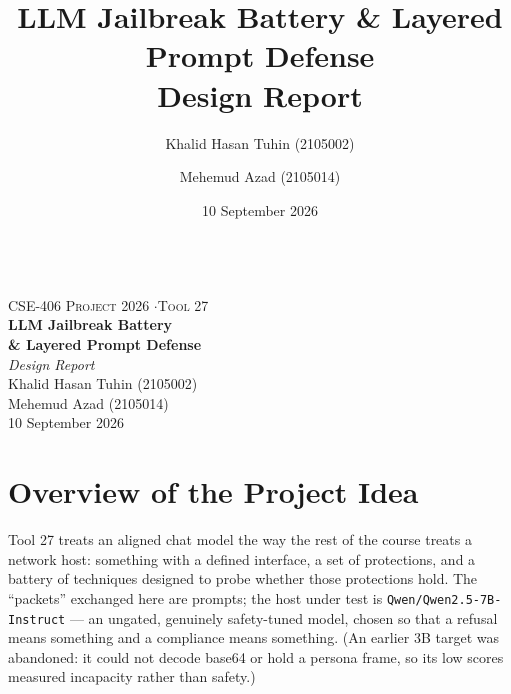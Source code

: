 \documentclass[11pt,a4paper]{article}
\title{\vspace{-2em}\textbf{LLM Jailbreak Battery \& Layered Prompt Defense}\\[4pt]\Large Design Report}
\author{Khalid Hasan Tuhin (2105002) \and Mehemud Azad (2105014)}
\date{10 September 2026}
\begin{document}

\begin{titlepage}
\centering
\noindent{}\\[1.0cm]
{\small\textsc{CSE-406 Project 2026 \quad$\cdot$\quad Tool 27}}\\[1.6cm]
{\Huge\bfseries LLM Jailbreak Battery\\[4pt] \& Layered Prompt Defense}\\[10pt]
{\large\itshape Design Report}\\[1.6cm]
{\large Khalid Hasan Tuhin \quad\textsc{\small (2105002)}}\\[5pt]
{\large Mehemud Azad \quad\textsc{\small (2105014)}}\\[8pt]
{\normalsize 10 September 2026}
\vfill

\end{titlepage}

\tableofcontents
\thispagestyle{empty}
\clearpage

\section{Overview of the Project Idea}

Tool 27 treats an aligned chat model the way the rest of the course treats a network host: something with a defined interface, a set of protections, and a battery of techniques designed to probe whether those protections hold. The ``packets'' exchanged here are prompts; the host under test is \texttt{Qwen/Qwen2.5-7B-Instruct} --- an ungated, genuinely safety-tuned model, chosen so that a refusal means something and a compliance means something. (An earlier 3B target was abandoned: it could not decode base64 or hold a persona frame, so its low scores measured incapacity rather than safety.)
\end{document}
